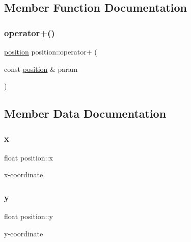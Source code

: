 \subsection{Member Function Documentation}
\mbox{\label{classposition_a6ddbf7075ea3cda800a544e395fc1524}} 
\subsubsection{\texorpdfstring{operator+()}{operator+()}}
{\footnotesize\ttfamily \mbox{\hyperlink{classposition}{position}} position\+::operator+ (\begin{DoxyParamCaption}\item[{const \mbox{\hyperlink{classposition}{position}} \&}]{param }\end{DoxyParamCaption})}



\subsection{Member Data Documentation}
\mbox{\label{classposition_a0019a0a4cc8203a3f24a6f32566bbbd1}} 
\subsubsection{\texorpdfstring{x}{x}}
{\footnotesize\ttfamily float position\+::x}



x-\/coordinate 

\mbox{\label{classposition_a1e0761bc9863e892ba24261551655313}} 
\subsubsection{\texorpdfstring{y}{y}}
{\footnotesize\ttfamily float position\+::y}



y-\/coordinate 

\mbox{\label{classposition_a9f6e4f705facb726a89fa289d20daf1a}} 
